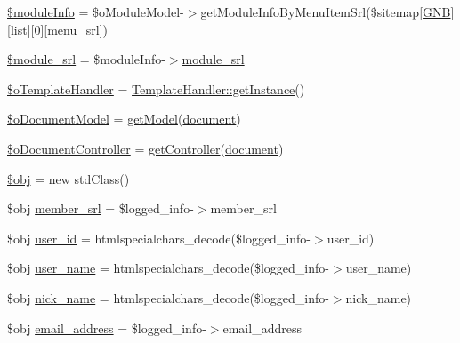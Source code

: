 \begin{DoxyCompactItemize}
\item 
\hyperlink{ko_8install_8php_ae3552a6dd49f37a50e7858151f7c5cc2}{\$module\+Info} = \$o\+Module\+Model-\/$>$get\+Module\+Info\+By\+Menu\+Item\+Srl(\$sitemap\mbox{[}\textquotesingle{}\hyperlink{ko_8install_8php_a9b1716b68fc04f3492448f38148dcbf5}{G\+N\+B}\textquotesingle{}\mbox{]}\mbox{[}\textquotesingle{}list\textquotesingle{}\mbox{]}\mbox{[}0\mbox{]}\mbox{[}\textquotesingle{}menu\+\_\+srl\textquotesingle{}\mbox{]})
\item 
\hyperlink{ko_8install_8php_ae40aed4d7a99050245e66ca2a82949ed}{\$module\+\_\+srl} = \$module\+Info-\/$>$\hyperlink{ko_8install_8php_a370bb6450fab1da3e0ed9f484a38b761}{module\+\_\+srl}
\item 
\hyperlink{ko_8install_8php_abd57e3ab220291ea9b5c16c2a4e0670e}{\$o\+Template\+Handler} = \hyperlink{classTemplateHandler_a9745460c5daccfc48abf8652778b2718}{Template\+Handler\+::get\+Instance}()
\item 
\hyperlink{ko_8install_8php_afb18aa87e5520385e76377e876e042af}{\$o\+Document\+Model} = \hyperlink{func_8inc_8php_aecdfcc5332bcf22df01fc21a03b64435}{get\+Model}(\textquotesingle{}\hyperlink{classdocument}{document}\textquotesingle{})
\item 
\hyperlink{ko_8install_8php_aac43fce682d4b7a05df6d3e44c2c54e6}{\$o\+Document\+Controller} = \hyperlink{func_8inc_8php_aa08f01e3bf130d770b373ca8493e3e9b}{get\+Controller}(\textquotesingle{}\hyperlink{classdocument}{document}\textquotesingle{})
\item 
\hyperlink{ko_8install_8php_a9008ed94ba185855b1723e367744b87e}{\$obj} = new std\+Class()
\item 
\$obj \hyperlink{ko_8install_8php_aa61f9e08f0fe505094d26f8143f30bbd}{member\+\_\+srl} = \$logged\+\_\+info-\/$>$member\+\_\+srl
\item 
\$obj \hyperlink{ko_8install_8php_a74f1a394389d774e5b4cd5d1d15413f7}{user\+\_\+id} = htmlspecialchars\+\_\+decode(\$logged\+\_\+info-\/$>$user\+\_\+id)
\item 
\$obj \hyperlink{ko_8install_8php_a115401aff7da80e73c66e9f76505426b}{user\+\_\+name} = htmlspecialchars\+\_\+decode(\$logged\+\_\+info-\/$>$user\+\_\+name)
\item 
\$obj \hyperlink{ko_8install_8php_a151ecae87a1f3d7e257aa089803086bd}{nick\+\_\+name} = htmlspecialchars\+\_\+decode(\$logged\+\_\+info-\/$>$nick\+\_\+name)
\item 
\$obj \hyperlink{ko_8install_8php_a1dffea0d5ba8194f8ef01f414af0c831}{email\+\_\+address} = \$logged\+\_\+info-\/$>$email\+\_\+address

\end{DoxyCompactItemize}
